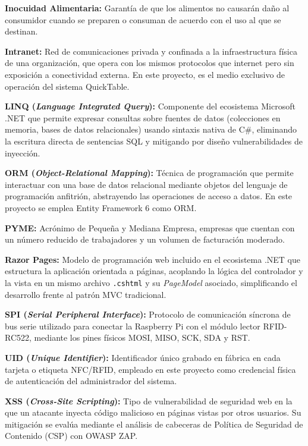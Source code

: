 \noindent
\textbf{Inocuidad Alimentaria:} Garantía de que los alimentos no causarán daño al consumidor cuando se preparen o consuman de acuerdo con el uso al que se destinan.

\noindent
\textbf{Intranet:} Red de comunicaciones privada y confinada a la infraestructura física de una organización, que opera con los mismos protocolos que internet pero sin exposición a conectividad externa. En este proyecto, es el medio exclusivo de operación del sistema QuickTable.

\noindent
\textbf{LINQ (\textit{Language Integrated Query}):} Componente del ecosistema Microsoft .NET que permite expresar consultas sobre fuentes de datos (colecciones en memoria, bases de datos relacionales) usando sintaxis nativa de C\#, eliminando la escritura directa de sentencias SQL y mitigando por diseño vulnerabilidades de inyección.

\noindent
\textbf{ORM (\textit{Object-Relational Mapping}):} Técnica de programación que permite interactuar con una base de datos relacional mediante objetos del lenguaje de programación anfitrión, abstrayendo las operaciones de acceso a datos. En este proyecto se emplea Entity Framework 6 como ORM.

\noindent
\textbf{PYME:} Acrónimo de Pequeña y Mediana Empresa, empresas que cuentan con un número reducido de trabajadores y un volumen de facturación moderado.

\noindent
\textbf{Razor Pages:} Modelo de programación web incluido en el ecosistema .NET que estructura la aplicación orientada a páginas, acoplando la lógica del controlador y la vista en un mismo archivo \texttt{.cshtml} y su \textit{PageModel} asociado, simplificando el desarrollo frente al patrón MVC tradicional.

\noindent
\textbf{SPI (\textit{Serial Peripheral Interface}):} Protocolo de comunicación síncrona de bus serie utilizado para conectar la Raspberry Pi con el módulo lector RFID-RC522, mediante los pines físicos MOSI, MISO, SCK, SDA y RST.

\noindent
\textbf{UID (\textit{Unique Identifier}):} Identificador único grabado en fábrica en cada tarjeta o etiqueta NFC/RFID, empleado en este proyecto como credencial física de autenticación del administrador del sistema.

\noindent
\textbf{XSS (\textit{Cross-Site Scripting}):} Tipo de vulnerabilidad de seguridad web en la que un atacante inyecta código malicioso en páginas vistas por otros usuarios. Su mitigación se evalúa mediante el análisis de cabeceras de Política de Seguridad de Contenido (CSP) con OWASP ZAP.


